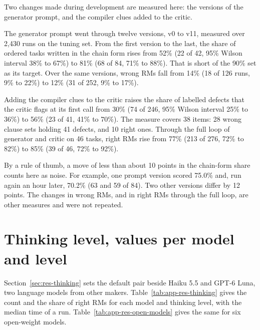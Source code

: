 \documentclass[11pt,english,listoffigures,listoftables]{tfgetsinf}
\begin{document}
Two changes made during development are measured here: the versions of the generator prompt, and the compiler clues added to the critic.

The generator prompt went through twelve versions, v0 to v11, measured over 2,430 runs on the tuning set. From the first version to the last, the share of ordered tasks written in the chain form rises from 52\% (22 of 42, 95\% Wilson interval 38\% to 67\%) to 81\% (68 of 84, 71\% to 88\%). That is short of the 90\% set as its target. Over the same versions, wrong RMs fall from 14\% (18 of 126 runs, 9\% to 22\%) to 12\% (31 of 252, 9\% to 17\%).

Adding the compiler clues to the critic raises the share of labelled defects that the critic flags at its first call from 30\% (74 of 246, 95\% Wilson interval 25\% to 36\%) to 56\% (23 of 41, 41\% to 70\%). The measure covers 38 items: 28 wrong clause sets holding 41 defects, and 10 right ones. Through the full loop of generator and critic on 46 tasks, right RMs rise from 77\% (213 of 276, 72\% to 82\%) to 85\% (39 of 46, 72\% to 92\%).

By a rule of thumb, a move of less than about 10 points in the chain-form share counts here as noise. For example, one prompt version scored 75.0\% and, run again an hour later, 70.2\% (63 and 59 of 84). Two other versions differ by 12 points. The changes in wrong RMs, and in right RMs through the full loop, are other measures and were not repeated.

\section{Thinking level, values per model and level}
\label{app:res-thinking}

Section~\ref{sec:res-thinking} sets the default pair beside Haiku 5.5 and GPT-6 Luna, two language models from other makers. Table~\ref{tab:app-res-thinking} gives the count and the share of right RMs for each model and thinking level, with the median time of a run. Table~\ref{tab:app-res-open-models} gives the same for six open-weight models.
\end{document}
